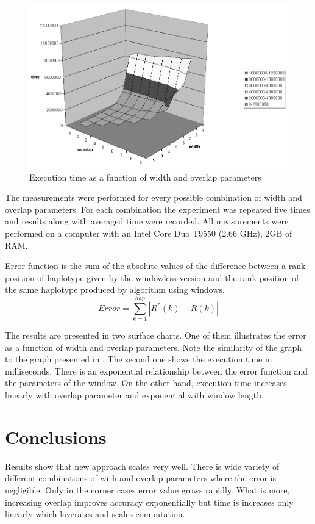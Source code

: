 \documentclass[]{spie}
\begin{document}
\begin{figure}
\centering
\includegraphics[scale=0.4]{images/czas}
\caption{Execution time as a function of width and overlap parameters}
\label{fig:time}
\end{figure}


The measurements were performed for every possible combination of width and overlap parameters.
For each combination the experiment was repeated five times and results along with averaged time were recorded.
All measurements were performed on a computer with an Intel Core Duo T9550 (2.66 GHz), 2GB of RAM.

Error function is the sum of the absolute values of the difference between a rank position of haplotype given by the windowless version and the rank position of the same haplotype produced by algorithm using windows.
$$ Error = \sum_{k=1}^{hap} |R^{*}(k) - R(k)|$$

The results are presented in two surface charts.
One of them illustrates the error as a function of width and overlap parameters.
Note the similarity of the graph to the graph presented in \cite{gusev}.
The second one shows the execution time in milliseconds.
There is an exponential relationship between the error function and the parameters of the window.
On the other hand, execution time increases linearly with overlap parameter and exponential with window length.


\section{Conclusions}

Results show that new approach scales very well.
There is wide variety of different combinations of with and overlap parameters where the error is negligible.
Only in the corner cases error value grows rapidly.
What is more, increasing overlap improves accuracy exponentially but time is increases only linearly which laverates and scales computation.



\end{document}
